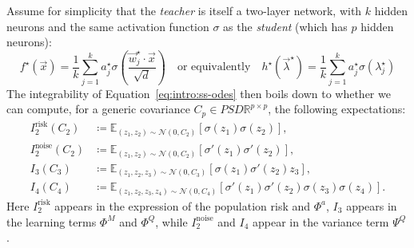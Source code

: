 Assume for simplicity that the \emph{teacher} is itself a two-layer network, with $k$ hidden neurons and the same activation function $\sigma$ as the \emph{student} (which has $p$ hidden neurons):
\begin{equation}
    f^\star(\vec{x}) = \frac1k \sum_{j=1}^k a_j^\star \sigma\left(\frac{\vec{w}_j^\star \cdot \vec{x}}{\sqrt{d}}\right)
    \quad\text{or equivalently}\quad
    h^\star(\vec{\lambda}^\star) = \frac1k \sum_{j=1}^k a_j^\star \sigma(\lambda_j^\star)
\end{equation}
The integrability of Equation~\eqref{eq:intro:ss-odes} then boils down to whether we can compute, for a generic covariance \(C_p \in PSD\mathbb{R}^{p \times p}\), the following expectations:
\begin{align}
    I_2^\text{risk}(C_2) &\coloneqq \mathbb{E}_{(z_1, z_2) \sim \mathcal{N}(0, C_2)}\left[ \sigma(z_1) \sigma(z_2) \right], \\
    I_2^\text{noise}(C_2) &\coloneqq \mathbb{E}_{(z_1, z_2) \sim \mathcal{N}(0, C_2)}\left[ \sigma'(z_1) \sigma'(z_2) \right], \\
    I_3(C_3) &\coloneqq \mathbb{E}_{(z_1, z_2, z_3) \sim \mathcal{N}(0, C_3)}\left[ \sigma(z_1) \sigma'(z_2) z_3 \right], \\
    I_4(C_4) &\coloneqq \mathbb{E}_{(z_1, z_2, z_3, z_4) \sim \mathcal{N}(0, C_4)}\left[ \sigma'(z_1) \sigma'(z_2) \sigma(z_3) \sigma(z_4) \right].
\end{align}
Here \(I_2^\text{risk}\) appears in the expression of the population risk and \(\Phi^a\), \(I_3\) appears in the learning terms \(\Phi^M\) and \(\Phi^Q\), while \(I_2^\text{noise}\) and \(I_4\) appear in the variance term \(\Psi^Q\).

